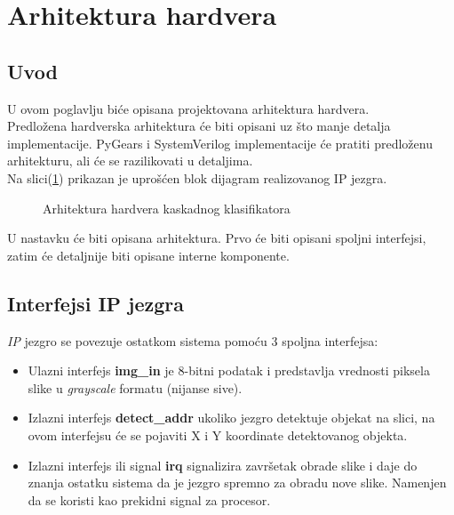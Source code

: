 \section{Arhitektura hardvera}

\subsection{Uvod}\label{hw_arch_intro}

U ovom poglavlju biće opisana projektovana arhitektura hardvera. \\
Predložena hardverska arhitektura će biti opisani uz što manje detalja
implementacije.
PyGears i SystemVerilog implementacije će pratiti predloženu arhitekturu, ali će
se razilikovati u detaljima. \\

Na slici(\ref{hw_arch_top}) prikazan je uprošćen blok dijagram realizovanog IP jezgra.
\begin{figure}[H]
\centering{
    \resizebox{\textwidth}{!}{%
    
  }}
\caption{Arhitektura hardvera kaskadnog klasifikatora}
\label{hw_arch_top}
\end{figure}

U nastavku će biti opisana arhitektura.
Prvo će biti opisani spoljni interfejsi, zatim će detaljnije biti opisane
interne komponente. \\

\subsection{Interfejsi IP jezgra}
\emph{IP} jezgro se povezuje ostatkom sistema pomoću 3 spoljna interfejsa:

\begin{itemize}
  \item Ulazni interfejs \textbf{img\_in} je 8-bitni podatak i predstavlja
    vrednosti piksela slike u \emph{grayscale} formatu (nijanse sive).
  \item Izlazni interfejs \textbf{detect\_addr} ukoliko jezgro detektuje objekat
    na slici, na ovom interfejsu će se pojaviti X i Y koordinate
    detektovanog objekta.
  \item Izlazni interfejs ili signal \textbf{irq} signalizira završetak obrade slike i
    daje do znanja ostatku sistema da je jezgro spremno za obradu nove slike.
    Namenjen da se koristi kao prekidni signal za procesor.
\end{itemize}


